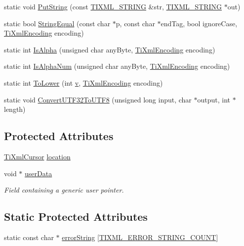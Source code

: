 \begin{DoxyCompactItemize}
\item 
static void \hyperlink{class_ti_xml_base_a283ddc4f1f53a53e7111eff4e12a63d9}{Put\+String} (const \hyperlink{tinyxml_8h_a92bada05fd84d9a0c9a5bbe53de26887}{T\+I\+X\+M\+L\+\_\+\+S\+T\+R\+I\+NG} \&str, \hyperlink{tinyxml_8h_a92bada05fd84d9a0c9a5bbe53de26887}{T\+I\+X\+M\+L\+\_\+\+S\+T\+R\+I\+NG} $\ast$out)
\item 
static bool \hyperlink{class_ti_xml_base_a51631e6986179558b9e5850723ed165a}{String\+Equal} (const char $\ast$p, const char $\ast$end\+Tag, bool ignore\+Case, \hyperlink{tinyxml_8h_a88d51847a13ee0f4b4d320d03d2c4d96}{Ti\+Xml\+Encoding} encoding)
\item 
static int \hyperlink{class_ti_xml_base_ae22522b2e8e1ac43102d16394f639fc8}{Is\+Alpha} (unsigned char any\+Byte, \hyperlink{tinyxml_8h_a88d51847a13ee0f4b4d320d03d2c4d96}{Ti\+Xml\+Encoding} encoding)
\item 
static int \hyperlink{class_ti_xml_base_a321919055c115c78ded17f85a793f368}{Is\+Alpha\+Num} (unsigned char any\+Byte, \hyperlink{tinyxml_8h_a88d51847a13ee0f4b4d320d03d2c4d96}{Ti\+Xml\+Encoding} encoding)
\item 
static int \hyperlink{class_ti_xml_base_a799f17405a86a5c2029618e85f11a097}{To\+Lower} (int \hyperlink{_multi_view_8cpp_a8320ee13ac034dbf6d624fe8953dd337}{v}, \hyperlink{tinyxml_8h_a88d51847a13ee0f4b4d320d03d2c4d96}{Ti\+Xml\+Encoding} encoding)
\item 
static void \hyperlink{class_ti_xml_base_a07c765e3a7f979d343e646ea797b180b}{Convert\+U\+T\+F32\+To\+U\+T\+F8} (unsigned long input, char $\ast$output, int $\ast$length)
\end{DoxyCompactItemize}
\subsection*{Protected Attributes}
\begin{DoxyCompactItemize}
\item 
\hyperlink{struct_ti_xml_cursor}{Ti\+Xml\+Cursor} \hyperlink{class_ti_xml_base_a0d992580f3bc264909f898e942677a3c}{location}
\item 
void $\ast$ \hyperlink{class_ti_xml_base_ab242c01590191f644569fa89a080d97c}{user\+Data}
\begin{DoxyCompactList}\small\item\em Field containing a generic user pointer. \end{DoxyCompactList}\end{DoxyCompactItemize}
\subsection*{Static Protected Attributes}
\begin{DoxyCompactItemize}
\item 
static const char $\ast$ \hyperlink{class_ti_xml_base_a7ac8feec4100e446b3d78e1ac0659700}{error\+String} \mbox{[}\hyperlink{class_ti_xml_base_a4b788e6990f18d930cc68e38587f05cda14552894942250efcec6b00dc52fc48a}{T\+I\+X\+M\+L\+\_\+\+E\+R\+R\+O\+R\+\_\+\+S\+T\+R\+I\+N\+G\+\_\+\+C\+O\+U\+NT}\mbox{]}
\end{DoxyCompactItemize}

